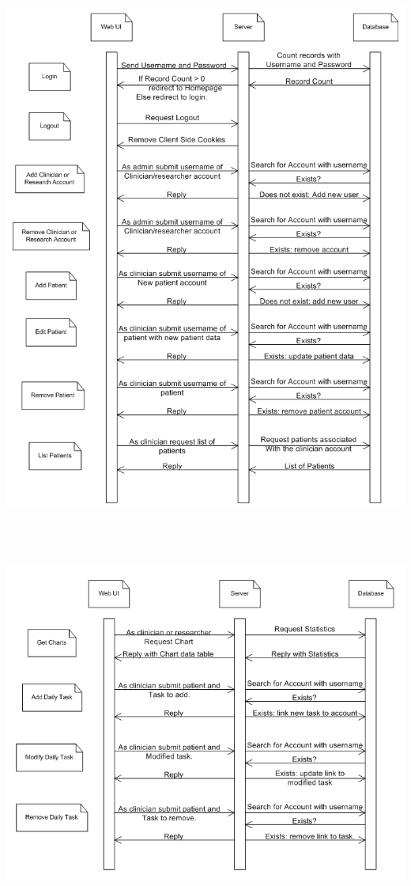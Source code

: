 \documentclass{article}
\begin{document}
\begin{center}
\includegraphics[width=6in,height=7.44in]{webui_interfaces_1.png}
\newpage
\includegraphics[width=6in,height=4.72in]{webui_interfaces_2.png}
\end{center}
\end{document}
